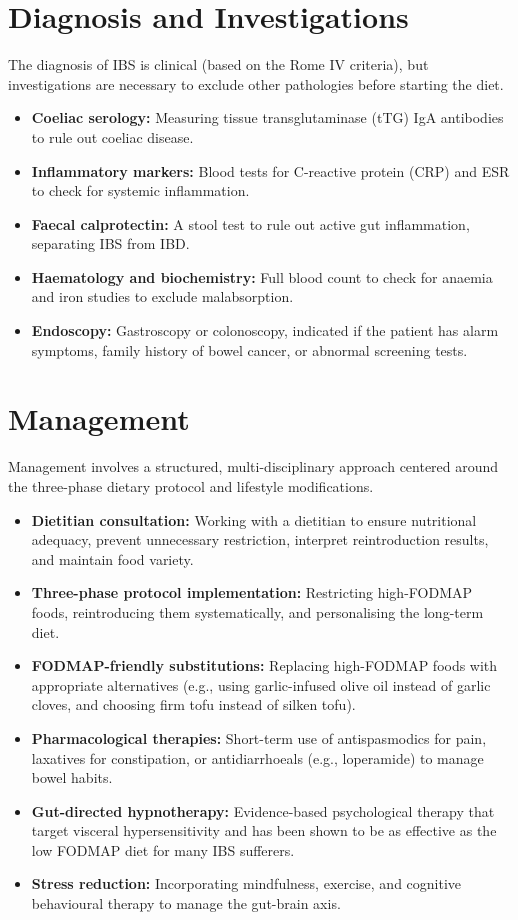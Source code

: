 \section*{Diagnosis and Investigations}
The diagnosis of IBS is clinical (based on the Rome IV criteria), but investigations are necessary to exclude other pathologies before starting the diet.

\begin{itemize}
    \item \textbf{Coeliac serology:} Measuring tissue transglutaminase (tTG) IgA antibodies to rule out coeliac disease.
    \item \textbf{Inflammatory markers:} Blood tests for C-reactive protein (CRP) and ESR to check for systemic inflammation.
    \item \textbf{Faecal calprotectin:} A stool test to rule out active gut inflammation, separating IBS from IBD.
    \item \textbf{Haematology and biochemistry:} Full blood count to check for anaemia and iron studies to exclude malabsorption.
    \item \textbf{Endoscopy:} Gastroscopy or colonoscopy, indicated if the patient has alarm symptoms, family history of bowel cancer, or abnormal screening tests.
\end{itemize}

\section*{Management}
Management involves a structured, multi-disciplinary approach centered around the three-phase dietary protocol and lifestyle modifications.

\begin{itemize}
    \item \textbf{Dietitian consultation:} Working with a dietitian to ensure nutritional adequacy, prevent unnecessary restriction, interpret reintroduction results, and maintain food variety.
    \item \textbf{Three-phase protocol implementation:} Restricting high-FODMAP foods, reintroducing them systematically, and personalising the long-term diet.
    \item \textbf{FODMAP-friendly substitutions:} Replacing high-FODMAP foods with appropriate alternatives (e.g., using garlic-infused olive oil instead of garlic cloves, and choosing firm tofu instead of silken tofu).
    \item \textbf{Pharmacological therapies:} Short-term use of antispasmodics for pain, laxatives for constipation, or antidiarrhoeals (e.g., loperamide) to manage bowel habits.
    \item \textbf{Gut-directed hypnotherapy:} Evidence-based psychological therapy that target visceral hypersensitivity and has been shown to be as effective as the low FODMAP diet for many IBS sufferers.
    \item \textbf{Stress reduction:} Incorporating mindfulness, exercise, and cognitive behavioural therapy to manage the gut-brain axis.
\end{itemize}

